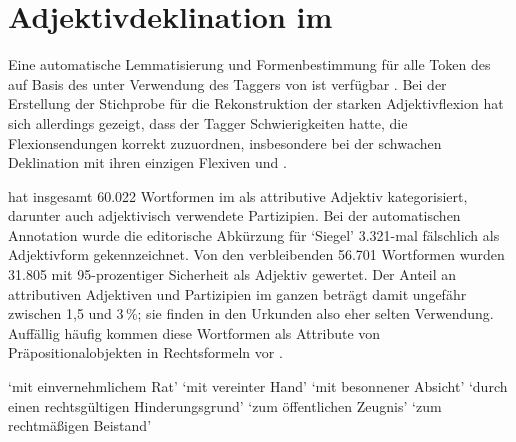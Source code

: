 
\section{Adjektivdeklination im }
\label{sec:adjdeclcao}

\label{phsec:formelhaftigkeit}

Eine automatische Lemmatisierung und Formenbestimmung für alle Token des
\CAO{} auf Basis des \REM{} unter Verwendung des Taggers von
\citet{schmid2019} ist verfügbar
\autocites[vgl.][207]{beckerschallert2021}[155--158]{beckerschallert2022b}. Bei
der Erstellung der Stichprobe für die Rekonstruktion der starken
Adjektivflexion hat sich allerdings gezeigt, dass der Tagger Schwierigkeiten
hatte, die Flexionsendungen korrekt zuzuordnen, insbesondere bei der schwachen
Deklination mit ihren einzigen Flexiven  und .

  hat insgesamt 60.022 Wortformen im \CAO{}
als attributive Adjektiv kategorisiert, darunter auch
adjektivisch verwendete Partizipien. Bei der automatischen
Annotation wurde die editorische Abkürzung  für `Siegel'
3.321-mal fälschlich als Adjektivform gekennzeichnet. Von den verbleibenden
56.701 Wortformen wurden 31.805 mit 95-prozentiger Sicherheit als Adjektiv
gewertet. Der Anteil an attributiven Adjektiven und Partizipien im ganzen
 beträgt damit ungefähr zwischen 1,5 und 3\,\%; sie finden in den
Urkunden also eher selten Verwendung. Auffällig häufig kommen diese
Wortformen als Attribute von Präpositionalobjekten in Rechtsformeln vor
\autocites[\ref{ex:adjprepobj}; vgl.][30]{becker2016}.

\begin{exe}
\ex \label{ex:adjprepobj}
	\begin{xlist}
	\ex {}
		`mit einvernehmlichem Rat'
	\ex {}
		`mit vereinter Hand'
	\ex {}
		`mit besonnener Absicht'
	\ex {}
		`durch einen rechtsgültigen Hinderungsgrund'
	\ex {}
		`zum öffentlichen Zeugnis'
	\ex {}
		`zum rechtmäßigen Beistand'
	\end{xlist}
\end{exe}

